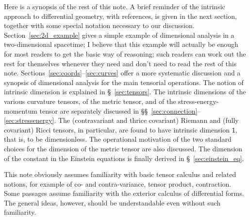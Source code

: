 \documentclass[\ifafour a4paper,12pt,\else a5paper,10pt,\fi%
onecolumn,oneside,article,%
british%
]{memoir}
\theoremstyle{remark}
\theoremstyle{innote}
\renewcommand*{\|}[1][]{\nonscript\,#1\vert\nonscript\;\mathopen{}}
\newcommand*{\sect}{\S}%
\newcommand*{\sects}{\S\S}%
\newcommand*{\Un}{\textsf{1}}
\begin{document}
Here is a synopsis of the rest of this note. A brief reminder of the
intrinsic approach to differential geometry, with references, is given in
the next section, together with some special notation necessary to our
discussion. Section~\ref{sec:2d_example} gives a simple example of
dimensional analysis in a two-dimensional spacetime; I believe that this
example will actually be enough for most readers to get the basic way of
reasoning; such readers can work out the rest for themselves whenever they
need and don't need to read the rest of this note.
Sections~\ref{sec:coords}--\ref{sec:curves} offer a more systematic
discussion and a synopsis of dimensional analysis for the main tensorial
operations. The notion of intrinsic dimension is explained in
\sect~\ref{sec:tensors}. The intrinsic dimensions of the various curvature
tensors, of the metric tensor, and of the stress-energy-momentum tensor are
separately discussed in
\sects~\ref{sec:connection}--\ref{sec:stressenergy}. The (contravariant and
thrice covariant) Riemann and (fully covariant) Ricci tensors, in
particular, are found to have intrinsic dimension $\Un$, that is, to be
dimensionless. The operational motivation of the two standard choices for
the dimension of the metric tensor are also discussed. The dimension of the
constant in the Einstein equations is finally derived in
\sect~\ref{sec:einstein_eq}.


This note obviously assumes familiarity with basic tensor calculus and
related notions, for example of co- and contra-variance, tensor product,
contraction. Some passages assume familiarity with the exterior calculus of
differential forms. The general ideas, however, should be understandable
even without such familiarity.







\end{document}
